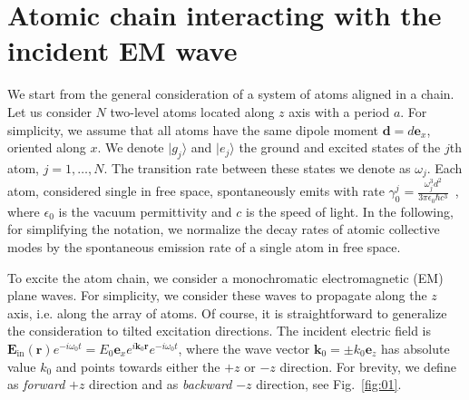 \documentclass[aps,prl,twocolumn,superscriptaddress,showpacs,amsmath,amssymb]{revtex4-2}
\begin{document}
\section{Atomic chain interacting with the incident EM wave}

We start from the general consideration of a system of atoms aligned in a chain. 
Let us consider $N$ two-level atoms located along $z$ axis with a period $a$.
For simplicity, we assume that all atoms have the same dipole moment $\mathbf{d} = d \mathbf{e}_x$, oriented along $x$.
We denote $|g_j\rangle$ and $|e_j\rangle$ the ground and excited states of the $j$th atom, $j = 1, \ldots, N$.
The transition rate between these states we denote as $\omega_j$.
Each atom, considered single in free space, spontaneously emits with rate $\gamma_0^j = \frac{\omega_j^3 d^2}{3 \pi \epsilon_0 \hbar c^3}$~\cite{carmichael1999statistical}, where $\epsilon_0$ is the vacuum permittivity and $c$ is the speed of light.
In the following, for simplifying the notation, we normalize the decay rates of atomic collective modes by the spontaneous emission rate of a single atom in free space.

To excite the atom chain, we consider a monochromatic electromagnetic (EM) plane waves.
For simplicity, we consider these waves to propagate along the $z$ axis, i.e. along the array of atoms.
Of course, it is straightforward to generalize the consideration to tilted excitation directions.
The incident electric field is $\mathbf{E}_\mathrm{in}(\mathbf{r})e^{- i \omega_0 t} = E_0 \mathbf{e}_x e^{i \mathbf{k}_0 \mathbf{r}} e^{- i \omega_0 t}$, where the wave vector $\mathbf{k}_0 = \pm k_0 \mathbf{e}_z$ has absolute value $k_0$ and points towards either the $+z$ or $-z$ direction. For
brevity, we define as \textit{forward} $+z$ direction and as \textit{backward} $-z$ direction, see Fig.~\ref{fig:01}.
\end{document}
